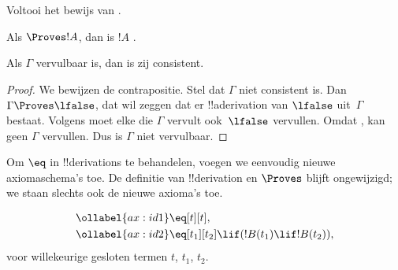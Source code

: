 \documentclass[openany]{memoir}
\begin{document}
\begin{prob}
  Voltooi het bewijs van .
\end{prob}
\tagendprob

\begin{cor}
Als $\Proves !A$, dan is $!A$ .
\end{cor}

\begin{cor}
Als $\Gamma$ vervulbaar is, dan is zij consistent.
\end{cor}

\begin{proof}
We bewijzen de contrapositie. Stel dat $\Gamma$ niet consistent is.
Dan $\Gamma \Proves \lfalse$, dat wil zeggen dat er
!!a{derivation} van $\lfalse$ uit~$\Gamma$ bestaat. Volgens
 moet elke
die $\Gamma$ vervult ook~$\lfalse$ vervullen. Omdat
, kan geen
 $\Gamma$ vervullen. Dus is
$\Gamma$ niet vervulbaar.
\end{proof}
\endgroup

\begingroup
\def\olfilename{OLP-0125}
\def\olfilepath{content/first-order-logic/axiomatic-deduction/}
\hypertarget{unit-OLP-0125}{}





Om $\eq$ in !!{derivation}s te behandelen, voegen we eenvoudig nieuwe
axiomaschema's toe. De definitie van !!{derivation} en $\Proves$ blijft
ongewijzigd; we staan slechts ook de nieuwe axioma's toe.

\begin{defn}
\begin{align}
\ollabel{ax:id1} & \eq[t][t], \\
\ollabel{ax:id2} & \eq[t_1][t_2] \lif (!B(t_1) \lif
  !B(t_2)),
\end{align}
voor willekeurige gesloten termen $t$, $t_1$, $t_2$.
\end{defn}
\end{document}
